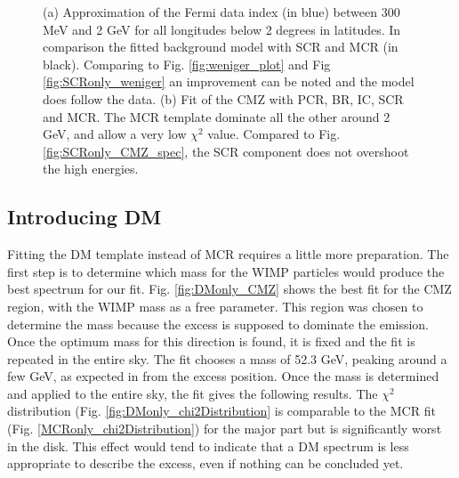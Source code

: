 \begin{figure}[h]
\begin{minipage}[h]{0.45\textwidth}
	  \subcaption{}
  	  \label{fig:MCRonly_CMZ}
  \end{minipage}
  \caption{(a) Approximation of the Fermi data index (in blue) between 300 MeV and 2 GeV for all longitudes below 2 degrees in latitudes. In comparison the fitted background model with SCR and MCR (in black). Comparing to Fig. \ref{fig:weniger_plot} and Fig \ref{fig:SCRonly_weniger} an improvement can be noted and the model does follow the data. (b) Fit of the CMZ with PCR, BR, IC, SCR and MCR. The MCR template dominate all the other around 2 GeV, and allow a very low $\chi^2$ value. Compared to Fig. \ref{fig:SCRonly_CMZ_spec}, the SCR component does not overshoot the high energies.}
  \label{fig:MCR_vs_SCRonly_CMZ}
\end{figure}



\subsection{Introducing DM}
%

%
%

Fitting the DM template instead of MCR requires a little more preparation. The first step is to determine which mass for the WIMP particles would produce the best spectrum for our fit. Fig. \ref{fig:DMonly_CMZ} shows the best fit for the CMZ region, with the WIMP mass as a free parameter. This region was chosen to determine the mass because the excess is supposed to dominate the emission. Once the optimum mass for this direction is found, it is fixed and the fit is repeated in the entire sky.
The fit chooses a mass of 52.3 GeV, peaking around a few GeV, as expected in from the excess position.
Once the mass is determined and applied to the entire sky, the fit gives the following results. The $\chi^2$ distribution (Fig. \ref{fig:DMonly_chi2Distribution} is comparable to the MCR fit (Fig. \ref{MCRonly_chi2Distribution}) for the major part but is significantly worst in the disk. This effect would tend to indicate that a DM spectrum is less appropriate to describe the excess, even if nothing can be concluded yet.


